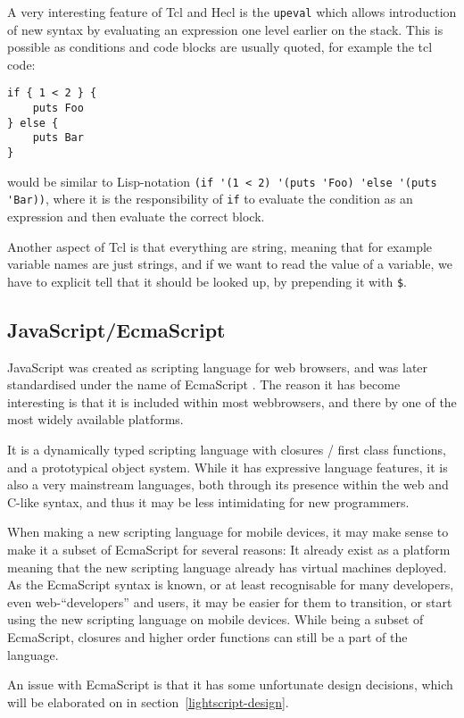 \documentclass[11pt]{report}
\begin{document}
A very interesting feature of Tcl and Hecl is the \verb|upeval| which allows introduction of new syntax by evaluating an expression one level earlier on the stack. 
This is possible as conditions and code blocks are usually quoted, for example the tcl code:
\begin{verbatim}
if { 1 < 2 } {
    puts Foo
} else {
    puts Bar
}
\end{verbatim}
would be similar to Lisp-notation \verb|(if '(1 < 2) '(puts 'Foo) 'else '(puts 'Bar))|, where it is the responsibility of \verb|if| to evaluate the condition as an expression and then evaluate the correct block. 

Another aspect of Tcl is that everything are string, meaning that for example variable names are just strings, and if we want to read the value of a variable, we have to explicit tell that it should be looked up, by prepending it with \verb|$|.

\subsection{JavaScript/EcmaScript}
\label{JavaScript}
JavaScript was created as scripting language for web browsers, and was later standardised under the name of EcmaScript \cite{ecma-262}.
The reason it has become interesting is that it is included within most webbrowsers, and there by one of the most widely available platforms.

It is a dynamically typed scripting language with closures / first class functions, and a prototypical object system.
While it has expressive language features, it is also a very mainstream languages, both through its presence within the web and C-like syntax, and thus it may be less intimidating for new programmers.

When making a new scripting language for mobile devices, it may make sense to make it a subset of EcmaScript for several reasons: It already exist as a platform meaning that the new scripting language already has virtual machines deployed. As the EcmaScript syntax is known, or at least recognisable for many developers, even web-``developers'' and users, it may be easier for them to transition, or start using the new scripting language on mobile devices. While being a subset of EcmaScript, closures and higher order functions can still be a part of the language.

An issue with EcmaScript is that it has some unfortunate design decisions\cite{crockford-web}, which will be elaborated on in section~\ref{lightscript-design}.
\end{document}
